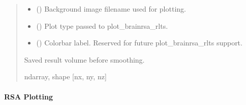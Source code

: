 \documentclass[letterpaper,10pt,english]{sphinxhowto}
\begin{document}
\begin{fulllineitems}
\begin{quote}
\begin{description}
\begin{itemize}
\item {} 
\sphinxAtStartPar
{} (\sphinxstyleliteralemphasis{\sphinxupquote{, }}) \textendash{} Background image filename used for plotting.

\item {} 
\sphinxAtStartPar
{} (\sphinxstyleliteralemphasis{\sphinxupquote{, }}\sphinxstyleliteralemphasis{\sphinxupquote{, }}) \textendash{} Plot type passed to plot\_brainrsa\_rlts.

\item {} 
\sphinxAtStartPar
{} (\sphinxstyleliteralemphasis{\sphinxupquote{, }}) \textendash{} Colorbar label. Reserved for future plot\_brainrsa\_rlts support.

\end{itemize}

\sphinxAtStartPar
{} \textendash{} Saved result volume before smoothing.

\sphinxAtStartPar
ndarray, shape {[}nx, ny, nz{]}

\end{description}\end{quote}

\end{fulllineitems}


\sphinxstepscope

\clearpage


\paragraph{RSA Plotting}
\label{\detokenize{rsa_plot:rsa-plotting}}\label{\detokenize{rsa_plot::doc}}
\sphinxAtStartPar
{}
\end{document}
